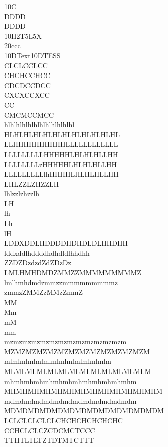 \documentclass{article}
\begin{document}
\begin{tikztimingexampletable}
 10C \\
 DD{}DD \\
 [D]DD{}DD \\
 10H2T5L5X \\
 [c]20{cc}c \\
 10D{Text}10D{TESS} \\
 CLCLCCLCC \\
 CHCHCCHCC \\
 CDCDCCDCC \\
 CXCXCCXCC \\
 CC \\
 CMCMCCMCC \\
%
 hlhlhlhlhlhlhlhlhlhlhlhl \\
 HLHLHLHLHLHLHLHLHLHLHLHL \\
 LLHHHHHHHHHHLLLLLLLLLLLL \\
 LLLLLLLLLHHHHHLHLHLHLLHH \\
 LLLLLLLLzHHHHHLHLHLHLLHH \\
 LLLLLLLLLlhHHHHLHLHLHLLHH \\
 LHLZZLZHZZLH \\
 lhlzzlzhzzlh \\
 LH \\
 lh \\
 Lh \\
 lH \\
 LDDXDDLHDDDDHDHDLDLHHDHH \\
 lddxddlhddddhdhdldlhhdhh \\
 ZZDZDzdzdZdZDzDz \\
 LMLHMHDMDZMMZZMMMMMMMMMZ \\
 lmlhmhdmdzmmzzmmmmmmmmmz \\
 zmmzZMMZzMMzZmmZ \\
 MM \\
 Mm \\
 mM \\
 mm \\
 mzmzmzmzmzmzmzmzmzmzmzmzmzm \\
 MZMZMZMZMZMZMZMZMZMZMZMZMZM \\
 mlmlmlmlmlmlmlmlmlmlmlmlmlm \\
 MLMLMLMLMLMLMLMLMLMLMLMLMLM \\
 mhmhmhmhmhmhmhmhmhmhmhmhmhm \\
 MHMHMHMHMHMHMHMHMHMHMHMHMHM \\
 mdmdmdmdmdmdmdmdmdmdmdmdmdm \\
 MDMDMDMDMDMDMDMDMDMDMDMDMDM \\
 LCLCLCLCLCLCHCHCHCHCHCHC\\
 CCHCLCLCZCDCMCTCCC\\
 TTHTLTLTZTDTMTCTTT \\
\end{tikztimingexampletable}
\end{document}
